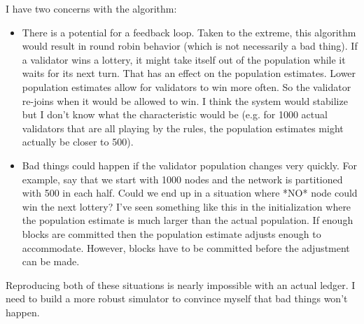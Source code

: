 I have two concerns with the algorithm:
\begin{itemize}
\item There is a potential for a feedback loop. Taken to the extreme,
  this algorithm would result in round robin behavior (which is not
  necessarily a bad thing). If a validator wins a lottery, it might take
  itself out of the population while it waits for its next turn. That
  has an effect on the population estimates. Lower population estimates
  allow for validators to win more often. So the validator re-joins when
  it would be allowed to win. I think the system would stabilize but I
  don't know what the characteristic would be (e.g. for 1000 actual
  validators that are all playing by the rules, the population estimates
  might actually be closer to 500).

\item Bad things could happen if the validator population changes very
  quickly. For example, say that we start with 1000 nodes and the
  network is partitioned with 500 in each half. Could we end up in a
  situation where *NO* node could win the next lottery? I've seen
  something like this in the initialization where the population
  estimate is much larger than the actual population. If enough blocks
  are committed then the population estimate adjusts enough to
  accommodate. However, blocks have to be committed before the
  adjustment can be made.
\end{itemize}

Reproducing both of these situations is nearly impossible with an actual
ledger. I need to build a more robust simulator to convince myself that
bad things won't happen.

